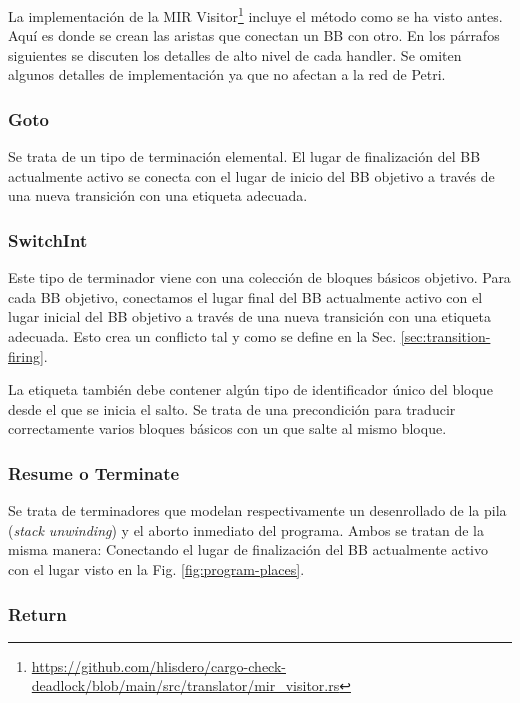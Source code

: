 La implementación de la MIR Visitor\footnote{\url{https://github.com/hlisdero/cargo-check-deadlock/blob/main/src/translator/mir_visitor.rs}}
incluye el método  como se ha visto
antes. Aquí es donde se crean las aristas que conectan un \acrshort{BB} con otro.
En los párrafos siguientes se discuten los detalles de alto nivel de cada handler.
Se omiten algunos detalles de implementación ya que no afectan a la red de Petri.

\subsubsection{Goto}

Se trata de un tipo de terminación elemental.
El lugar de finalización del \acrshort{BB} actualmente
activo se conecta con el lugar de inicio del \acrshort{BB} objetivo
a través de una nueva transición con una etiqueta adecuada.

\subsubsection{SwitchInt}

Este tipo de terminador viene con una colección de bloques básicos objetivo.
Para cada \acrshort{BB} objetivo,
conectamos el lugar final del \acrshort{BB} actualmente activo
con el lugar inicial del \acrshort{BB} objetivo
a través de una nueva transición con una etiqueta adecuada.
Esto crea un conflicto tal y como se define en la Sec. \ref{sec:transition-firing}.

La etiqueta también debe contener algún tipo de identificador único del bloque desde el que se
inicia el salto. Se trata de una precondición para traducir correctamente varios bloques
básicos con un  que salte al mismo bloque.

\subsubsection{Resume o Terminate}

Se trata de terminadores que modelan respectivamente un desenrollado de la pila (\textit{stack unwinding})
y el aborto inmediato del programa.
Ambos se tratan de la misma manera: Conectando el lugar de
finalización del \acrshort{BB} actualmente activo
con el lugar  visto en la Fig. \ref{fig:program-places}.

\subsubsection{Return}

